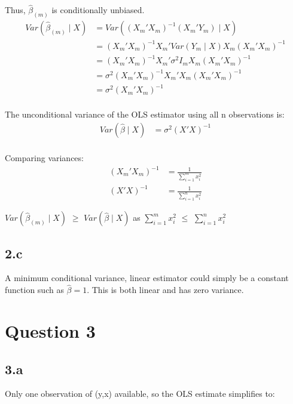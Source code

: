 \documentclass{article}
\begin{document}
Thus, $\hat{\beta}_{(m)}$ is conditionally unbiased.
\begin{align*}
    Var(\hat{\beta}_{(m)} \mid X)
    &= Var((X_{m}'X_{m})^{-1} (X_{m}'Y_{m}) \mid X) \\
    &= (X_{m}'X_{m})^{-1} X_{m}' Var(Y_{m} \mid X) X_{m} (X_{m}'X_{m})^{-1} \\
    &= (X_{m}'X_{m})^{-1} X_{m}' \sigma^2 I_{m} X_{m} (X_{m}'X_{m})^{-1} \\
    &= \sigma^2 (X_{m}'X_{m})^{-1} X_{m}'X_{m} (X_{m}'X_{m})^{-1} \\
    &= \sigma^2 (X_{m}'X_{m})^{-1} \\
\end{align*}

The unconditional variance of the OLS estimator using all n observations is:
\begin{align*}
    Var(\hat{\beta} \mid X)
    &= \sigma^2 (X'X)^{-1} \\
\end{align*}

Comparing variances:
\begin{align*}
    (X_{m}'X_{m})^{-1} 
    &= \frac{1}{\sum_{i=1}^{m} x_{i}^2} \\
    (X'X)^{-1}
    &= \frac{1}{\sum_{i=1}^{n} x_{i}^2}
\end{align*}

$Var(\hat{\beta}_{(m)} \mid X)$ $\ge$ $Var(\hat{\beta} \mid X)$ as $\sum_{i=1}^{m}x_{i}^2$ $\le$ $\sum_{i=1}^{n}x_{i}^2$

\subsection*{2.c}

A minimum conditional variance, linear estimator could simply be a constant function such as $\hat{\beta} = 1$. This is both linear and has zero variance.


\clearpage
\section*{Question 3}

\subsection*{3.a}

Only one observation of (y,x) available, so the OLS estimate simplifies to:
\end{document}
